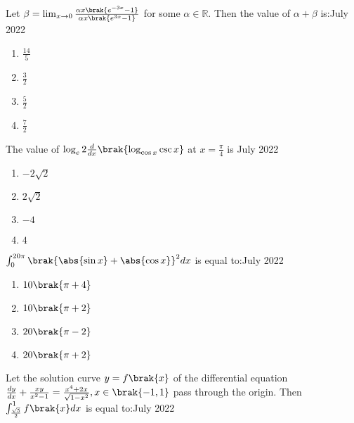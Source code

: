     \item Let $\beta = \lim_{x \rightarrow 0} \frac{\alpha x \brak{e^{-3x} - 1}}{\alpha x \brak{e^{3x} - 1}}$ for some $\alpha \in \mathbb{R}$. Then the value of $\alpha + \beta$ is:\hfill{July 2022}

        \begin{multicols}{4}
        \begin{enumerate}
        \item $\frac{14}{5}$
        \item $\frac{3}{2}$
        \item $\frac{5}{2}$
        \item $\frac{7}{2}$
        \end{enumerate}
        \end{multicols}

   \item The value of $\log_{e} 2 \frac{d}{dx} \brak{\log_{\cos{x}} \csc{x}}$ at $x = \frac{\pi}{4}$ is \hfill{July 2022}

        \begin{multicols}{4}
        \begin{enumerate}
        \item $-2\sqrt{2}$
        \item $2\sqrt{2}$
        \item $-4$
        \item $4$
        \end{enumerate}
        \end{multicols}

    \item $\int_{0}^{20\pi} \brak{\abs{\sin{x}} + \abs{\cos{x}}}^{2} dx$ is equal to:\hfill{July 2022}

        \begin{multicols}{4}
        \begin{enumerate}
        \item $10 \brak{\pi + 4}$
        \item $10 \brak{\pi + 2}$
        \item $20 \brak{\pi - 2}$
        \item $20 \brak{\pi + 2}$
        \end{enumerate}
        \end{multicols}

    \item Let the solution curve $y = f \brak{x}$ of the differential equation $\frac{dy}{dx} + \frac{xy}{x^{2} - 1} = \frac{x^{4} + 2x}{\sqrt{1 - x^{2}}}, x \in \brak{-1, 1}$ pass through the origin. Then $\int_{\frac{\sqrt{5}}{2}}^{1} f \brak{x} dx$ is equal to:\hfill{July 2022}

